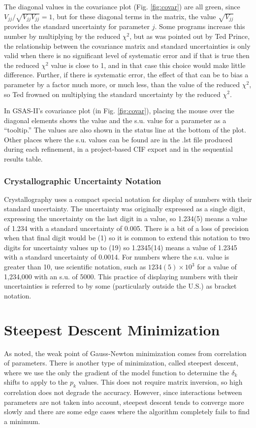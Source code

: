 The diagonal values in the covariance plot (Fig. \ref{fig:covar}) are all green, since $V_{jj} / \sqrt{V_{jj}V_{jj}} = 1$, but for these diagonal terms in the matrix, the value $\sqrt{V_{jj}}$ provides the standard uncertainty for parameter $j$. Some programs increase this number by multiplying by the reduced $\chi^2$, but as was pointed out by Ted Prince, the relationship between the covariance matrix and standard uncertainties is only valid when there is no significant level of systematic error and if that is true then the reduced $\chi^2$ value is close to 1, and in that case this choice would make little difference. Further, if there is systematic error, the effect of that can be to bias a parameter by a factor much more, or much less, than the value of the reduced $\chi^2$, so Ted frowned on multiplying the standard uncertainty by the reduced $\chi^2$. 

In GSAS-II's covariance plot (in Fig. \ref{fig:covar}), placing the mouse over the diagonal elements shows the value and the s.u. value for a parameter as a ``tooltip.'' The values are also shown in the status line at the bottom of the plot. Other places where the s.u. values can be found are in the .lst file produced during each refinement, in a project-based CIF export and in the sequential results table. 

\subsubsection{Crystallographic Uncertainty Notation}
Crystallography uses a compact special notation for display of numbers with their standard uncertainty. The uncertainty was originally expressed as a single digit, expressing the uncertainty on the last digit in a value, so 1.234(5) means a value of 1.234 with a standard uncertainty of 0.005. There is a bit of a loss of precision when that final digit would be (1) so it is common to extend this notation to two digits for uncertainty values up to (19) so 1.2345(14) means a value of 1.2345 with a standard uncertainty of 0.0014. For numbers where the s.u. value is greater than 10, use scientific notation, such as  $1234(5) \times 10^3$ for a value of 1,234,000 with an s.u. of 5000. This practice of displaying numbers with their uncertainties is referred to by some (particularly outside the U.S.) as bracket notation.\label{ref:SUnotation}


\section{Steepest Descent Minimization}
As noted, the weak point of Gauss-Newton minimization comes from correlation of parameters. There is another type of minimization, called steepest descent, where we use the only the gradient of the model function to determine the $\delta_k$ shifts to apply to the $p_k$ values. This does not require matrix inversion, so high correlation does not degrade the accuracy. However, since interactions between parameters are not taken into account, steepest descent tends to converge more slowly and there are some edge cases where the algorithm completely fails to find a minimum. 

